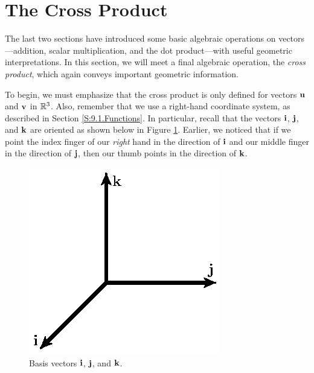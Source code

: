 \section{The Cross Product} \label{S:9.4.Cross_Product}

\vspace*{-14 pt}

The last two sections have introduced some basic algebraic operations
on vectors---addition, scalar multiplication, and the dot
product---with useful geometric interpretations.  In
this section, we will meet a final algebraic operation, the {\em cross
  product}, which again conveys important geometric information.

To begin, we must emphasize that the cross product is only defined for
vectors $\mathbf{u}$ and $\mathbf{v}$ in $\mathbb{R}^3$.  
Also, remember that we use a right-hand coordinate
system, as described in Section \ref{S:9.1.Functions}.  In
particular, recall that the vectors $\mathbf{i}$, $\mathbf{j}$, and $\mathbf{k}$ are
oriented as shown below in Figure \ref{F:9.4.basis}.  Earlier, we
noticed that if we point the index finger of our {\em right} hand in
the direction of $\mathbf{i}$ and our middle finger in the direction of
$\mathbf{j}$, then our thumb points in the direction of $\mathbf{k}$.

\begin{figure}[ht]
  \begin{center}
    \includegraphics{figures/fig_9_4_basis.eps}
    \caption{Basis vectors $\mathbf{i}$, $\mathbf{j}$, and $\mathbf{k}$.}
    \label{F:9.4.basis}
  \end{center}
\end{figure}

